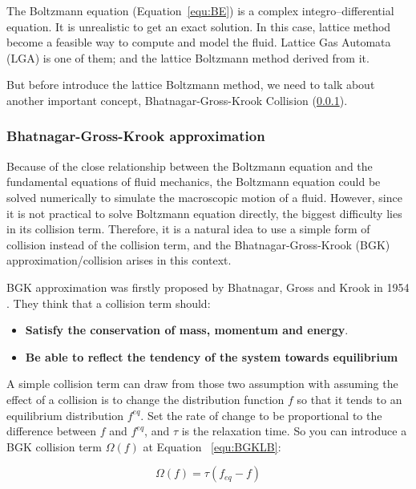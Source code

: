 The Boltzmann equation (Equation~\ref{equ:BE}) is a complex integro–differential equation. It is unrealistic to get an exact solution. In this case, lattice method become a feasible way to compute and model the fluid. Lattice Gas Automata (LGA) \cite{frisch1986lattice} is one of them; and the lattice Boltzmann method derived from it.

But before introduce the lattice Boltzmann method, we need to talk about another important concept, Bhatnagar-Gross-Krook Collision (\ref{sec:BKG}).

\subsubsection{Bhatnagar-Gross-Krook approximation} \label{sec:BKG}
Because of the close relationship between the Boltzmann equation and the fundamental equations of fluid mechanics, the Boltzmann equation could be solved numerically to simulate the macroscopic motion of a fluid. However, since it is not practical to solve Boltzmann equation directly, the biggest difficulty lies in its collision term\cite{chew1956boltzmann}. Therefore, it is a natural idea to use a simple form of collision instead of the collision term, and the Bhatnagar-Gross-Krook (BGK) approximation/collision \cite{bgk} arises in this context.

BGK approximation was firstly proposed by Bhatnagar, Gross and Krook in 1954 \cite{bgk}. They think that a collision term should: 

\begin{itemize}
\item \textbf{Satisfy the conservation of mass, momentum and energy}. 

\item \textbf{Be able to reflect the tendency of the system towards equilibrium}
\end{itemize}

A simple collision term can draw from those two assumption with assuming the effect of a collision is to change the distribution function $f$ so that it tends to an equilibrium distribution $f^{eq}$. Set the rate of change to be proportional to the difference between $f$ and $f^{eq}$, and $\tau$ is the relaxation time. So you can introduce a BGK collision term $\Omega (f)$ at Equation ~\ref{equ:BGKLB}:

\begin{equation}
\label{equ:BGKLB}
    \Omega (f) = \tau(f_{eq} - f)
\end{equation}

